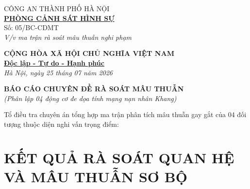 \documentclass[12pt,a4paper]{article}
\begin{document}
\noindent
\begin{minipage}[t]{0.45\textwidth}
    \begin{center}
        \small
        CÔNG AN THÀNH PHỐ HÀ NỘI\\
        \textbf{\underline{PHÒNG CẢNH SÁT HÌNH SỰ}}\\[0.1cm]
        Số: 05/BC-CDMT\\
        \textit{V/v ma trận rà soát mâu thuẫn nghi phạm}
    \end{center}
\end{minipage}
\hfill
\begin{minipage}[t]{0.52\textwidth}
    \begin{center}
        \small
        \textbf{CỘNG HÒA XÃ HỘI CHỦ NGHĨA VIỆT NAM}\\
        \textbf{\underline{Độc lập - Tự do - Hạnh phúc}}\\[0.1cm]
        \textit{Hà Nội, ngày 25 tháng 07 năm 2026}
    \end{center}
\end{minipage}

\vspace{0.6cm}

\begin{center}
    \textbf{\large BÁO CÁO CHUYÊN ĐỀ RÀ SOÁT MÂU THUẪN}\\
    \textit{(Phân lập 04 động cơ đe dọa tính mạng nạn nhân Khang)}
\end{center}

\vspace{0.3cm}

\noindent Tổ điều tra chuyên án tổng hợp ma trận phân tích mâu thuẫn gay gắt của 04 đối tượng thuộc diện nghi vấn trọng điểm:

\section*{KẾT QUẢ RÀ SOÁT QUAN HỆ VÀ MÂU THUẪN SƠ BỘ}
\end{document}
